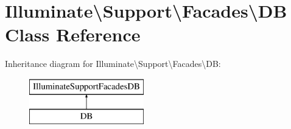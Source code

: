 \hypertarget{class_illuminate_1_1_support_1_1_facades_1_1_d_b}{}\section{Illuminate\textbackslash{}Support\textbackslash{}Facades\textbackslash{}DB Class Reference}
\label{class_illuminate_1_1_support_1_1_facades_1_1_d_b}
Inheritance diagram for Illuminate\textbackslash{}Support\textbackslash{}Facades\textbackslash{}DB\+:\begin{figure}[H]
\begin{center}
\leavevmode
\includegraphics[height=2.000000cm]{class_illuminate_1_1_support_1_1_facades_1_1_d_b}
\end{center}
\end{figure}
